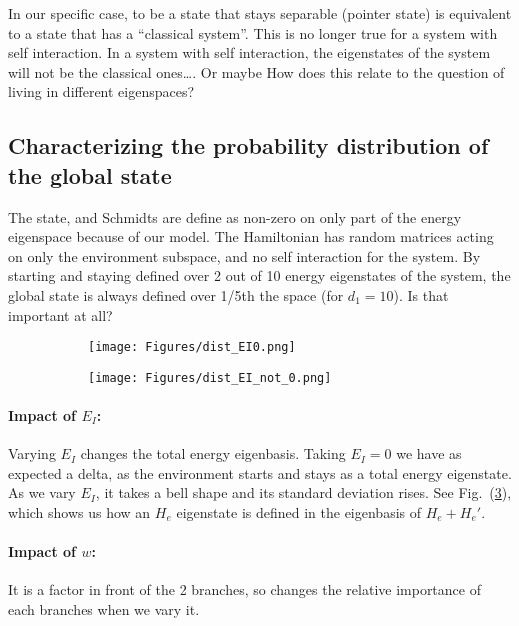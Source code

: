 \documentclass{article}
\begin{document}
In our specific case, to be a state that stays separable (pointer state) is equivalent to a state that has a “classical system”. 
This is no longer true for a system with self interaction. In a system with self interaction, the eigenstates of the system will not be the classical ones…. Or maybe
How does this relate to the question of living in different eigenspaces?


\subsection{Characterizing the probability distribution of the global state}

The state, and Schmidts are define as non-zero on only part of the energy eigenspace because of our model. The Hamiltonian has random matrices acting on only the environment subspace, and no self interaction for the system. By starting and staying defined over 2 out of 10 energy eigenstates of the system, the global state is always defined over 1/5th the space (for $d_1=10$). Is that important at all? \\

\begin{figure}[h!]
  \centering
  \begin{subfigure}[b]{0.4\linewidth}
    \texttt{[image: Figures/dist\_EI0.png]}
    \label{fig:1}
  \end{subfigure}
  \begin{subfigure}[b]{0.4\linewidth}
    \texttt{[image: Figures/dist\_EI\_not\_0.png]}
    \label{fig:2}
  \end{subfigure}
  \caption{}
  \label{fig:dist_EI_dep}
\end{figure}

\paragraph{Impact of $E_I$: }Varying $E_I$ changes the total energy eigenbasis. Taking $E_I=0$ we have as expected a delta, as the environment starts and stays as a total energy eigenstate. As we vary $E_I$, it takes a bell shape and its standard deviation rises. See Fig.~(\ref{fig:dist_EI_dep}), which shows us how an $H_e$ eigenstate is defined in the eigenbasis of $H_e+H_e'$. 

\paragraph{Impact of $w$: }It is a factor in front of the 2 branches, so changes the relative importance of each branches when we vary it.
\end{document}
